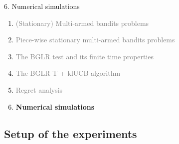 \documentclass[11pt,english,ignorenonframetext,]{beamer}
\begin{document}
\begin{frame}{6. Numerical simulations}

  \begin{enumerate}
    \item
    \textcolor{gray}{
      (Stationary) Multi-armed bandits problems
    }
    \vspace*{15pt}

    \item
    \textcolor{gray}{
      Piece-wise stationary multi-armed bandits problems
    }
    \vspace*{15pt}

    \item
    \textcolor{gray}{
      The BGLR test and its finite time properties
    }
    \vspace*{15pt}

    \item
    \textcolor{gray}{
      The BGLR-T + klUCB algorithm
    }
    \vspace*{15pt}

    \item
    \textcolor{gray}{
      Regret analysis
    }
    \vspace*{15pt}

    \item
    \alert{\textbf{%
      Numerical simulations
    }}
  \end{enumerate}

\end{frame}


\subsection{\hfill{}Setup of the experiments\hfill{}}
\end{document}

